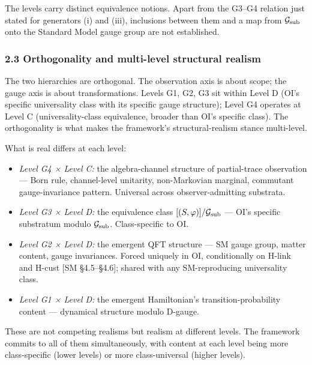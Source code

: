 \documentclass[
]{article}
\providecommand{\tightlist}{%
  \setlength{\itemsep}{0pt}\setlength{\parskip}{0pt}}
\begin{document}
The levels carry distinct equivalence notions. Apart from the G3--G4
relation just stated for generators (i) and (iii), inclusions between
them and a map from \(\mathcal{G}_{\rm sub}\) onto the Standard Model
gauge group are not established.

\hypertarget{orthogonality-and-multi-level-structural-realism}{%
\subsubsection{2.3 Orthogonality and multi-level structural
realism}\label{orthogonality-and-multi-level-structural-realism}}

The two hierarchies are orthogonal. The observation axis is about scope;
the gauge axis is about transformations. Levels G1, G2, G3 sit within
Level D (OI's specific universality class with its specific gauge
structure); Level G4 operates at Level C (universality-class
equivalence, broader than OI's specific class). The orthogonality is
what makes the framework's structural-realism stance multi-level.

What is real differs at each level:

\begin{itemize}
\tightlist
\item
  \emph{Level G4 × Level C:} the algebra-channel structure of
  partial-trace observation --- Born rule, channel-level unitarity,
  non-Markovian marginal, commutant gauge-invariance pattern. Universal
  across observer-admitting substrata.
\item
  \emph{Level G3 × Level D:} the equivalence class
  \([(S, \varphi)]/\mathcal{G}_{\rm sub}\) --- OI's specific substratum
  modulo \(\mathcal{G}_{\rm sub}\). Class-specific to OI.
\item
  \emph{Level G2 × Level D:} the emergent QFT structure --- SM gauge
  group, matter content, gauge invariances. Forced uniquely in OI,
  conditionally on H-link and H-cust {[}SM §4.5--§4.6{]}; shared with
  any SM-reproducing universality class.
\item
  \emph{Level G1 × Level D:} the emergent Hamiltonian's
  transition-probability content --- dynamical structure modulo D-gauge.
\end{itemize}

These are not competing realisms but realism at different levels. The
framework commits to all of them simultaneously, with content at each
level being more class-specific (lower levels) or more class-universal
(higher levels).
\end{document}
